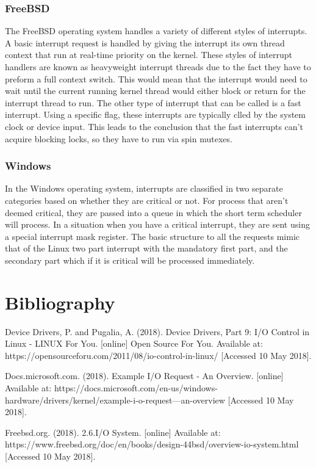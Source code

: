 \documentclass[draftclsnofoot, onecolumn] {report}
\begin{document}
\subsection{FreeBSD}
The FreeBSD operating system handles a variety of different styles of interrupts. 
A basic interrupt request is handled by giving the interrupt its own thread context that run at real-time priority on the kernel. 
These styles of interrupt handlers are known as heavyweight interrupt threads due to the fact they have to preform a full context switch.
This would mean that the interrupt would need to wait until the current running kernel thread would either block or return for the interrupt thread to run. 
The other type of interrupt that can be called is a fast interrupt.
Using a specific flag, these interrupts are typically clled by the system clock or device input.
This leads to the conclusion that the fast interrupts can't acquire blocking locks, so they have to run via spin mutexes. 

\subsection{Windows}
In the Windows operating system, interrupts are classified in two separate categories based on whether they are critical or not. 
For process that aren't deemed critical, they are passed into a queue in which the short term scheduler will process.
In a situation when you have a critical interrupt, they are sent using a special interrupt mask register.
The basic structure to all the requests mimic that of the Linux two part interrupt with the mandatory first part, and the secondary part which if it is critical will be processed immediately. 


\chapter{Bibliography}
Device Drivers, P. and Pugalia, A. (2018). Device Drivers, Part 9: I/O Control in Linux - LINUX For You. [online] Open Source For You. Available at: https://opensourceforu.com/2011/08/io-control-in-linux/ [Accessed 10 May 2018].

Docs.microsoft.com. (2018). Example I/O Request - An Overview. [online] Available at: https://docs.microsoft.com/en-us/windows-hardware/drivers/kernel/example-i-o-request---an-overview [Accessed 10 May 2018].

Freebsd.org. (2018). 2.6.I/O System. [online] Available at: https://www.freebsd.org/doc/en/books/design-44bsd/overview-io-system.html [Accessed 10 May 2018].
\end{document}
